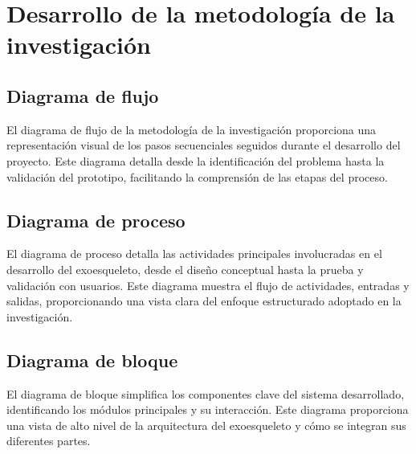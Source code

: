 \chapter{Desarrollo de la metodología de la investigación}
\section{Diagrama de flujo}
El diagrama de flujo de la metodología de la investigación proporciona una representación visual de los pasos secuenciales seguidos durante el desarrollo del proyecto. Este diagrama detalla desde la identificación del problema hasta la validación del prototipo, facilitando la comprensión de las etapas del proceso.

\section{Diagrama de proceso}
El diagrama de proceso detalla las actividades principales involucradas en el desarrollo del exoesqueleto, desde el diseño conceptual hasta la prueba y validación con usuarios. Este diagrama muestra el flujo de actividades, entradas y salidas, proporcionando una vista clara del enfoque estructurado adoptado en la investigación.

\section{Diagrama de bloque}
El diagrama de bloque simplifica los componentes clave del sistema desarrollado, identificando los módulos principales y su interacción. Este diagrama proporciona una vista de alto nivel de la arquitectura del exoesqueleto y cómo se integran sus diferentes partes.
